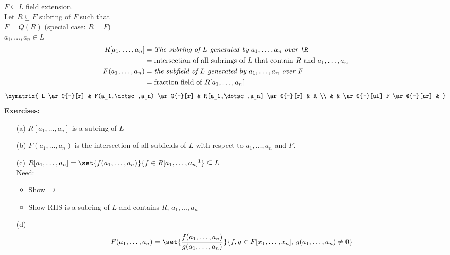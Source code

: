  $F\subseteq L$ field extension. \\
Let $R\subseteq F$ subring of $F$ such that \\
$F=Q(R)$ (special case: $R=F$) \\
$a_1,\dotsc,a_n\in L$ \\
\begin{align*}
R[a_1,\dotsc,a_n] &= \text{\emph{The subring of $L$ generated by $a_1,\dotsc,a_n$ over $\R$}} \\
&= \text{intersection of all subrings of $L$ that contain $R$ and $a_1,\dotsc,a_n$} \\
F(a_1,\dotsc,a_n) &= \text{\emph{the subfield of $L$ generated by $a_1,\dotsc,a_n$ over $F$}} \\
&= \text{fraction field of $R[a_1,\dotsc,a_n]$}
\end{align*}
\[ \xymatrix{
L \ar@{-}[r] & F(a_1,\dotsc,a_n) \ar@{-}[r] & R[a_1,\dotsc,a_n] \ar@{-}[r] & R \\
  &                   & \ar@{-}[ul] F \ar@{-}[ur]                 &
} \]
\textbf{Exercises:}
\begin{enumerate}
\item[(a)] $R[a_1,\dotsc,a_n]$ is a subring of $L$
\item[(b)] $F(a_1,\dotsc,a_n)$ is the intersection of all subfields of $L$ with respect to $a_1,\dotsc,a_n$ and $F$.
\item[(c)] $R[a_1,\dotsc,a_n]=\set{f(a_1,\dotsc,a_n)}{f\in R[a_1,\dotsc,a_n]\footnotemark}\subseteq L$ \\
Need:
\begin{itemize}
\item Show $\supseteq$
\item Show RHS is a subring of $L$ and contains $R$, $a_1,\dotsc,a_n$
\end{itemize}
\item[(d)]
\[ F(a_1,\dotsc,a_n) = \set{\frac{f(a_1,\dotsc,a_n)}{g(a_1,\dotsc,a_n)}}{f,g\in F[x_1,\dotsc,x_n]\text{, }g(a_1,\dotsc,a_n)\neq0} \]
\end{enumerate}

